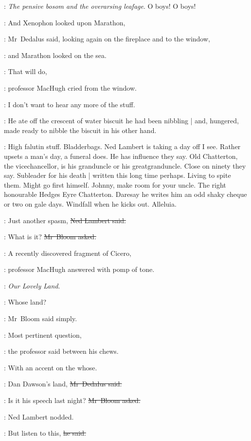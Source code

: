 \lambert:
\stage{[as Dawson]}
\emph{The pensive bosom and the overarsing leafage}.
O boys!
O boys!

\simon:
And Xenophon looked upon Marathon,

:
Mr~Dedalus said,
looking again on the fireplace and to the window,

\simon:
and Marathon looked on the sea.

\machugh:
That will do,

:
professor MacHugh cried from the window.

\machugh:
I don't want to hear any more of the stuff.

:
He ate off the crescent of water biscuit
he had been nibbling |
and, hungered,
made ready to nibble the biscuit in his other hand.

\BloomInt:
High falutin stuff.
Bladderbags.
Ned Lambert is taking a day off I see.
Rather upsets a man's day, a funeral does.
He has influence they say.
Old Chatterton, the vicechancellor, is his granduncle or his greatgranduncle.
Close on ninety they say.
Subleader for his death |
written this long time perhaps.
Living to spite them.
Might go first himself.
Johnny, make room for your uncle.
The right honourable Hedges Eyre Chatterton.
Daresay he writes him an odd shaky cheque or two on gale days.
Windfall when he kicks out. Alleluia.

\lambert:
Just another spasm,
\sout{Ned Lambert said.}

\Bloom:
What is it?
\sout{Mr~Bloom asked.}

\machugh:
A recently discovered fragment of Cicero,

:
professor MacHugh answered
with pomp of tone.

\machugh:
\emph{Our Lovely Land}.



\Bloom:
Whose land?

:
Mr~Bloom said simply.

\machugh:
Most pertinent question,

:
the professor said between his chews.

\machugh:
With an accent on the whose.

\simon:
Dan Dawson's land,
\sout{Mr~Dedalus said.}

\Bloom:
Is it his speech last night?
\sout{Mr~Bloom asked.}

:
Ned Lambert nodded.

\lambert:
But listen to this,
\sout{he said.}

